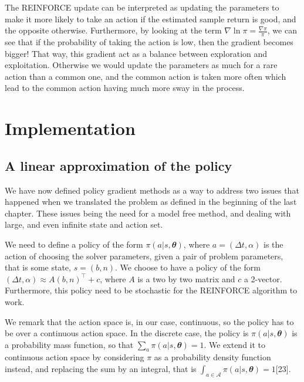 \documentclass[
  letterpaper,
]{report}
\theoremstyle{definition}
\theoremstyle{plain}
\theoremstyle{definition}
\theoremstyle{remark}
\begin{document}
The REINFORCE update can be interpreted as updating the parameters to
make it more likely to take an action if the estimated sample return is
good, and the opposite otherwise. Furthermore, by looking at the term
\(\nabla \ln \pi = \frac{\nabla \pi}{\pi}\), we can see that if the
probability of taking the action is low, then the gradient becomes
bigger! That way, this gradient act as a balance between exploration and
exploitation. Otherwise we would update the parameters as much for a
rare action than a common one, and the common action is taken more often
which lead to the common action having much more sway in the process.


\chapter{Implementation}\label{implementation}

\section{A linear approximation of the policy}\label{sec-linear_policy}

We have now defined policy gradient methods as a way to address two
issues that happened when we translated the problem as defined in the
beginning of the last chapter. These issues being the need for a model
free method, and dealing with large, and even infinite state and action
set.

We need to define a policy of the form \(\pi(a|s,\mathbfit{\theta})\),
where \(a=(\Delta t, \alpha)\) is the action of choosing the solver
parameters, given a pair of problem parameters, that is some state,
\(s=(b,n)\). We choose to have a policy of the form
\((\Delta t, \alpha) \approx A(b,n)^\intercal + c\), where \(A\) is a
two by two matrix and \(c\) a 2-vector. Furthermore, this policy need to
be stochastic for the REINFORCE algorithm to work.

We remark that the action space is, in our case, continuous, so the
policy has to be over a continuous action space. In the discrete case,
the policy is \(\pi(a|s,\mathbfit{\theta})\) is a probability mass
function, so that \(\sum_a\pi(a|s,\mathbfit{\theta}) = 1\). We extend it
to continuous action space by considering \(\pi\) as a probability
density function instead, and replacing the sum by an integral, that is
\(\int_{a\in \mathcal{A}}\pi(a|s,\mathbfit{\theta}) = 1\){[}23{]}.
\end{document}
